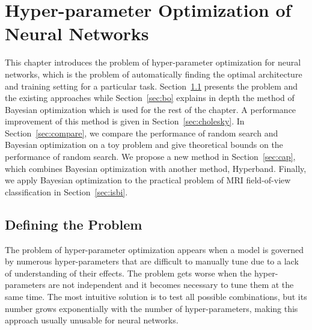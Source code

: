 \chapter{Hyper-parameter Optimization of Neural Networks}
\label{chap:hyperopt}

\begin{chapabstract}
This chapter introduces the problem of hyper-parameter optimization for neural networks, which is the problem of automatically finding the optimal architecture and training setting for a particular task. Section~\ref{sec:ho_lit} presents the problem and the existing approaches while Section~\ref{sec:bo} explains in depth the method of Bayesian optimization which is used for the rest of the chapter. A performance improvement of this method is given in Section~\ref{sec:cholesky}. In Section~\ref{sec:compare}, we compare the performance of random search and Bayesian optimization on a toy problem and give theoretical bounds on the performance of random search. We propose a new method in Section~\ref{sec:cap}, which combines Bayesian optimization with another method, Hyperband. Finally, we apply Bayesian optimization to the practical problem of MRI field-of-view classification in Section~\ref{sec:isbi}.
\end{chapabstract}

\vspace{1cm}

{   
    \minitoc
}

\newpage

\section{Defining the Problem}
\label{sec:ho_lit}

The problem of hyper-parameter optimization appears when a model is governed by numerous hyper-parameters that are difficult to manually tune due to a lack of understanding of their effects. The problem gets worse when the hyper-parameters are not independent and it becomes necessary to tune them at the same time. The most intuitive solution is to test all possible combinations, but its number grows exponentially with the number of hyper-parameters, making this approach usually unusable for neural networks.

